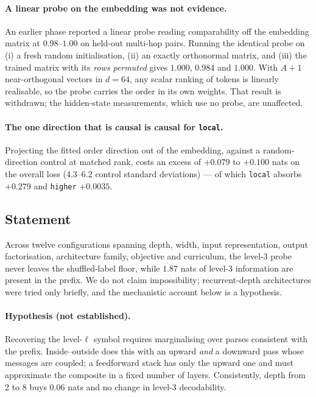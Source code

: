 \paragraph{A linear probe on the embedding was not evidence.}
An earlier phase reported a linear probe reading comparability off the
embedding matrix at $0.98$--$1.00$ on held-out multi-hop pairs. Running the
identical probe on (i) a fresh random initialisation, (ii) an exactly
orthonormal matrix, and (iii) the trained matrix with its \emph{rows permuted}
gives $1.000$, $0.984$ and $1.000$. With $A+1$ near-orthogonal vectors in
$d=64$, any scalar ranking of tokens is linearly realisable, so the probe
carries the order in its own weights. That result is withdrawn; the
hidden-state measurements, which use no probe, are unaffected.

\paragraph{The one direction that is causal is causal for \texttt{local}.}
Projecting the fitted order direction out of the embedding, against a
random-direction control at matched rank, costs an excess of
$+0.079$ to $+0.100$ nats on the overall loss ($4.3$--$6.2$ control standard
deviations) --- of which \texttt{local} absorbs $+0.279$ and \texttt{higher}
$+0.0035$.

\subsection{Statement}

Across twelve configurations spanning depth, width, input representation,
output factorisation, architecture family, objective and curriculum, the
level-3 probe never leaves the shuffled-label floor, while $1.87$ nats of
level-3 information are present in the prefix. We do not claim impossibility;
recurrent-depth architectures were tried only briefly, and the mechanistic
account below is a hypothesis.

\paragraph{Hypothesis (not established).}
Recovering the level-$\ell$ symbol requires marginalising over parses
consistent with the prefix. Inside--outside does this with an upward
\emph{and} a downward pass whose messages are coupled; a feedforward stack has
only the upward one and must approximate the composite in a fixed number of
layers. Consistently, depth from 2 to 8 buys $0.06$ nats and no change in
level-3 decodability.


